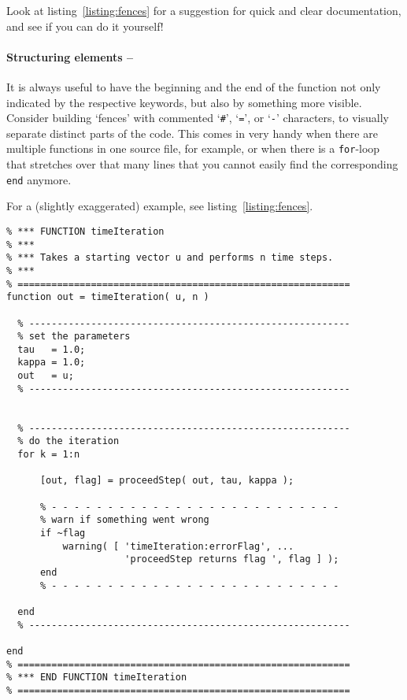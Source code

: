 Look at listing~\ref{listing:fences} for a suggestion for quick and clear
documentation, and see if you can do it yourself!


\paragraph{Structuring elements -- \cleansymbol\cleansymbol\cleansymbol}
It is always useful to have the beginning and the end of the function not only indicated by the respective keywords, but also by something more visible. Consider building `fences' with commented `\lstinline!#!', `\lstinline!=!', or `\lstinline!-!' characters, to visually separate distinct parts of the code. This comes in very handy when there are multiple functions in one source file, for example, or when there is a \lstinline!for!-loop that stretches over that many lines that you cannot easily find the corresponding \lstinline!end! anymore.

For a (slightly exaggerated) example, see listing~\ref{listing:fences}.

\begin{lstlisting}[float,label={listing:fences},caption={Function in which `\lstinline!-!'-fences are used to emphasize the functionally separate sections of the code.}]
% ===========================================================
% *** FUNCTION timeIteration
% ***
% *** Takes a starting vector u and performs n time steps.
% ***
% ===========================================================
function out = timeIteration( u, n )

  % ---------------------------------------------------------
  % set the parameters
  tau   = 1.0;
  kappa = 1.0;
  out   = u;
  % ---------------------------------------------------------


  % ---------------------------------------------------------
  % do the iteration
  for k = 1:n

      [out, flag] = proceedStep( out, tau, kappa );

      % - - - - - - - - - - - - - - - - - - - - - - - - - -
      % warn if something went wrong
      if ~flag
          warning( [ 'timeIteration:errorFlag', ...
                     'proceedStep returns flag ', flag ] );
      end
      % - - - - - - - - - - - - - - - - - - - - - - - - - -

  end
  % ---------------------------------------------------------

end
% ===========================================================
% *** END FUNCTION timeIteration
% ===========================================================
\end{lstlisting}



